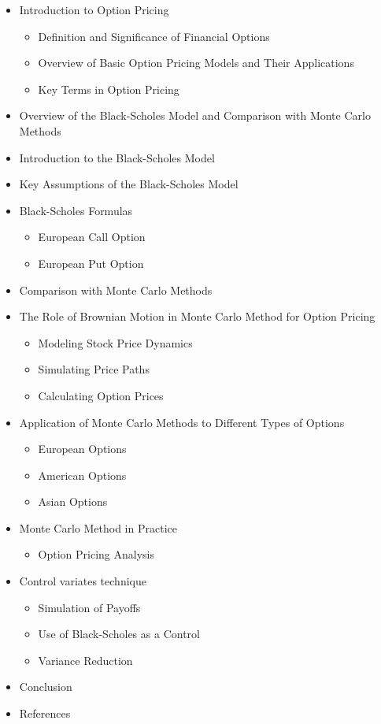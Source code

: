 \documentclass{article}
\begin{document}
\begin{itemize}
    \item Introduction to Option Pricing
        \begin{itemize}
            \item Definition and Significance of Financial Options
            \item Overview of Basic Option Pricing Models and Their Applications
            \item Key Terms in Option Pricing
        \end{itemize}
    \item Overview of the Black-Scholes Model and Comparison with Monte Carlo Methods
    \item Introduction to the Black-Scholes Model
    \item Key Assumptions of the Black-Scholes Model
    \item Black-Scholes Formulas
        \begin{itemize}
            \item European Call Option
            \item European Put Option
        \end{itemize}
    \item Comparison with Monte Carlo Methods
    \item The Role of Brownian Motion in Monte Carlo Method for Option Pricing
        \begin{itemize}
            \item Modeling Stock Price Dynamics
            \item Simulating Price Paths
            \item Calculating Option Prices
        \end{itemize}
    \item Application of Monte Carlo Methods to Different Types of Options
        \begin{itemize}
            \item European Options
            \item American Options
            \item Asian Options
        \end{itemize}
    \item Monte Carlo Method in Practice
        \begin{itemize}
            \item Option Pricing Analysis 
        \end{itemize}
    \item Control variates technique
        \begin{itemize}
            \item Simulation of Payoffs
            \item Use of Black-Scholes as a Control
            \item Variance Reduction
        \end{itemize}
    
    \item Conclusion
    \item References
\end{itemize}
\end{document}
